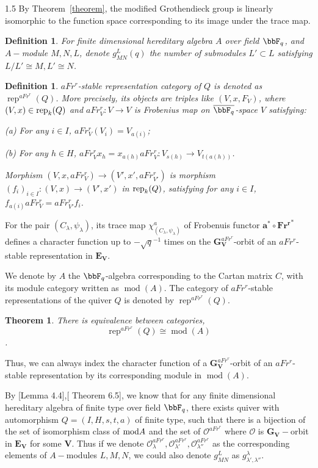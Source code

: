 \documentclass[10pt]{amsart}
\newtheorem{definition}[theorem]{Definition}
\newtheorem{thm}{Theorem}
\def\mod{\mbox{\rm mod}} \def\mx{\mbox{\rm max}} \def\tr{\mbox{\rm tr}}
\def\rep{\mbox{\rm Rep}\,}  \def\soc{\mbox{\rm soc}\,}\def\sm{e}\def\prep{\mbox{\rm Prep}\,}  \def\prei{\mbox{\rm Prei}\,}
\def\bfV{{\mathbf V}}
\def\rep{{\rm rep}}
\def\bfV{\mathbf{V}}
\def\bfE{\mathbf{E}}
\def\bfG{\mathbf{G}}
\newcommand\mo{{\mathcal{O}}}
\begin{document}
\begin{spacing}{1.5}
By Theorem~\ref{theorem}, the modified Grothendieck group is linearly isomorphic to the function space corresponding to its image under the trace map.

\begin{definition}
    For finite dimensional hereditary algebra $A$ over field $\bbF_q$, and $A-$module $M,N,L$, denote $g_{MN}^{L}(q)$ the number of submodules $L'\subset L$ satisfying $L/L'\cong M, L'\cong N$.
\end{definition}
\begin{definition}
$aFr^r$-stable representation category of $Q$ is denoted as $\operatorname{rep}^{aFr^r}(Q)$. More precisely, its objects are triples like $(V, x, F_V)$, where $(V, x) \in \rep_k(Q)$ and $aFr^r_V: V \rightarrow V$ is Frobenius map on $\overline{\bbF_q}$-space $V$ 
 satisfying:  

{\rm{(a)}} For any $i \in I$, $aFr^r_V(V_i) = V_{a(i)}$;

{\rm{(b)}} For any $h \in H$, $aFr^r_V x_h = x_{a(h)} aFr^r_V: V_{s(h)} \rightarrow V_{t(a(h))}$.  

Morphism $(V, x, aFr^r_V) \rightarrow (V', x', aFr^r_{V'})$ is morphism $(f_i)_{i \in I}: (V, x) \rightarrow (V', x')$ in $\rep_k(Q)$, satisfying for any $i \in I$, $f_{a(i)} aFr^r_V = aFr^r_{V'} f_i$.
\end{definition}

For the pair $(C_{\lambda}, \psi_{\lambda})$, its trace map $\chi^a_{(C_{\lambda}, \psi_{\lambda})}$ of Frobenuis functor $\mathbf{a}^*\circ \mathbf{Fr^r}^*$ defines a character function up to $-\sqrt{q}^{-1}$ times on the $\bfG_{\bfV}^{aFr^r}$-orbit of an $aFr^r$-stable representation in $\bfE_{\bfV}$.

We denote by $A$ the $\bbF_q$-algebra corresponding to the Cartan matrix $C$, with its module category written as $\operatorname{mod}(A)$. The category of $aFr^r$-stable representations of the quiver $Q$ is denoted by $\operatorname{rep}^{aFr^r}(Q)$.

\begin{thm}\cite[Theorem 3.2, Section 9]{deng2006frobenius}\label{22}
    There is equivalence between categories,
    $$\operatorname{rep}^{aFr^r}(Q)\cong \operatorname{mod}(A)$$.
\end{thm}
Thus, we can always index the character function of a $\bfG_{\bfV}^{aFr^r}$-orbit of an $aFr^r$-stable representation by its corresponding module in $\operatorname{mod}(A)$.

By \cite{Fang2025}[Lemma 4.4],\cite{deng2006frobenius}[ Theorem 6.5], we know that for any finite dimensional hereditary algebra of finite type over field $\bbF_q$, there exists quiver with automorphism $Q=(I,H,s,t,a)$ of finite type, such that there is a bijection of the set of isomorphism class of $\mod A$ and the set of $\mo^{aFr^r}$ where $\mo$ is $\bfG_{\bfV}-$orbit in $\bfE_{\bfV}$ for some $\bfV$. Thus if we denote $\mo_{\lambda}^{aFr^r},\mo_{\lambda'}^{aFr^r},\mo_{\lambda''}^{aFr^r}$ as the corresponding elements of $A-$modules $L,M,N$, we could also denote $g_{MN}^{L}$ as $g_{\lambda', \lambda''}^{\lambda}$.


\end{spacing}
\end{document}
